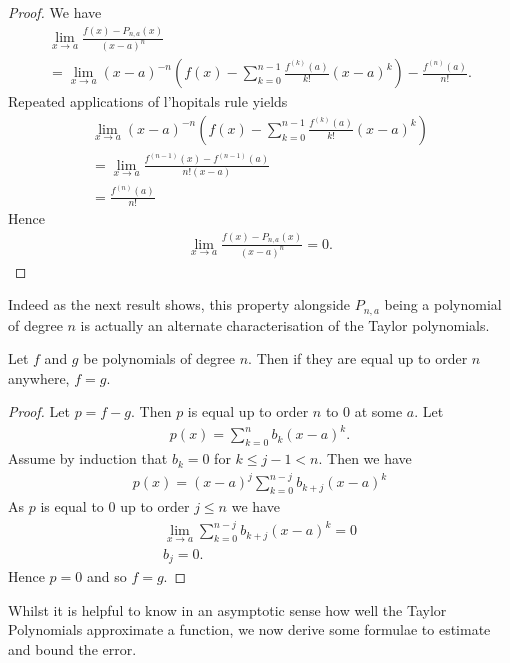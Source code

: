 \documentclass[]{article}
\begin{document}
\begin{proof}
	We have
	\begin{align*}
			\lim_{x \to a} \frac{f(x) - P_{n,a}(x)}{(x-a)^n} \\
			= \lim_{x\to a} (x-a)^{-n}(f(x) - \sum_{k=0}^{n-1} \frac{f^{(k)}(a)}{k!} (x-a)^k) - \frac{f^{(n)}(a)}{n!}.
	\end{align*}
	Repeated applications of l'hopitals rule yields 
	 \begin{align*}
			\lim_{x\to a} (x-a)^{-n}(f(x) - \sum_{k=0}^{n-1} \frac{f^{(k)}(a)}{k!} (x-a)^k) \\
			= \lim_{x\to a} \frac{f^{(n-1)}(x) - f^{(n-1)}(a)}{n! (x-a)} \\
			= \frac{f^{(n)}(a)}{n!}
	\end{align*}
	Hence
	\begin{align*}
			\lim_{x \to a} \frac{f(x) - P_{n,a}(x)}{(x-a)^n} = 0.
	\end{align*}
\end{proof}

Indeed as the next result shows, this property alongside $P_{n,a}$ being a polynomial of degree $n$ is actually an alternate characterisation of the Taylor polynomials.

\begin{thm}
	Let $f$ and $g$ be polynomials of degree $n$. Then if they are equal up to order $n$ anywhere, $f=g$.		
\end{thm}

\begin{proof}
	Let $p = f-g$. Then $p$  is equal up to order $n$ to $0$ at some $a$. Let 
	\begin{align*}
			p(x) = \sum_{k=0}^n b_k (x-a)^k.
	\end{align*}
	Assume by induction that $b_k=0$ for $k \leq j - 1 < n$. Then we have
	\begin{align*}
			p(x) = (x-a)^j \sum_{k=0}^{n-j} b_{k+j} (x-a)^k
	\end{align*}
	As $p$ is equal to $0$ up to order $j \leq n$ we have
	\begin{align*}
			\lim_{x \to a} \sum_{k=0}^{n-j} b_{k+j} (x-a)^k = 0 \\
			b_j = 0.
	\end{align*}
	Hence $p = 0$ and so $f= g$.
\end{proof}

Whilst it is helpful to know in an asymptotic sense how well the Taylor Polynomials approximate a function, we now derive some formulae to estimate and bound the error.
\end{document}
